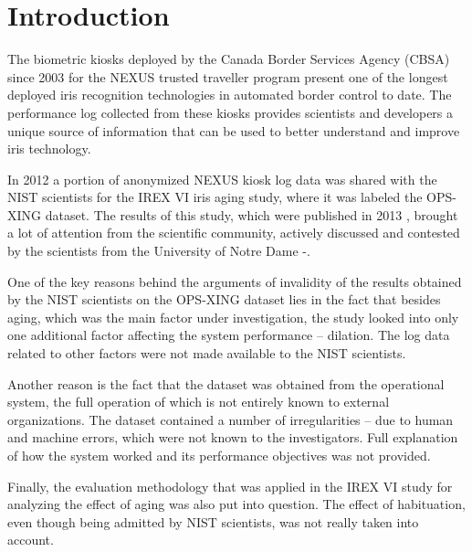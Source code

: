 \documentclass{cta-author}%
\begin{document}
\maketitle



\section{Introduction}

The 
biometric kiosks deployed by the Canada Border Services Agency (CBSA) since 2003 for the NEXUS trusted traveller program  \cite{[CBSA-NEXUS]} present one of
the longest deployed iris recognition technologies in automated border control to date.
The performance log collected from these kiosks provides scientists and developers a unique source of information that can be used to better understand and improve iris technology.



In 2012 a portion  of anonymized NEXUS kiosk log data was shared with the NIST scientists for the IREX VI  iris aging study,  where it was labeled the OPS-XING dataset.   
The results of this study, which were published in 2013 \cite{irexVI}, brought a lot of attention from the scientific community,  
actively discussed and contested by the scientists from the University of Notre Dame \cite{IET0}-\cite{Bowyer-BTAS2016}.

One of the key reasons behind the arguments of invalidity of the results obtained by the NIST scientists on the OPS-XING dataset lies in the fact that 
besides aging, which was the main factor under investigation,  the study looked  into only one additional factor affecting the system performance -- dilation. The  log data related to other factors were not made available to the NIST scientists. %
 
Another reason is the fact that the dataset was obtained from the operational system, the full operation of which 
is not entirely known to external organizations.
The dataset contained a number of irregularities -- due to human and machine errors, which were not known to the investigators.
Full explanation of how the system worked and its performance objectives
was not provided.

Finally, the evaluation methodology that was applied in the IREX VI study for analyzing the effect of aging 
was  also put into question. The effect of habituation, even though being admitted by NIST scientists, was not really taken into account. 
\end{document}
